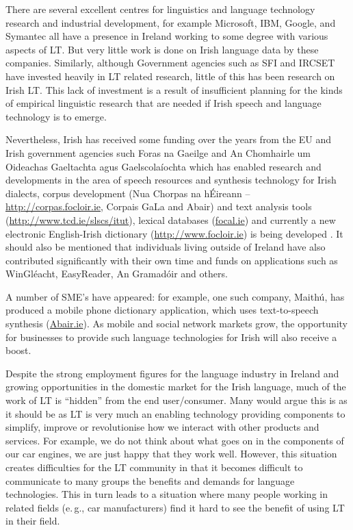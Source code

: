 \begin{multicols}{2}
There are several excellent centres for linguistics and language technology research and industrial development, for example Microsoft, IBM, Google, and Symantec all have a presence in Ireland working to some degree with various aspects of LT. But very little work is done on Irish language data by these companies. Similarly, although Government agencies such as SFI and IRCSET have invested heavily in LT related research, little of this has been research on Irish LT. This lack of investment is a result of insufficient planning for the kinds of empirical linguistic research that are needed if Irish speech and language technology is to emerge. 

Nevertheless, Irish has received some funding over the years from the EU and Irish government agencies such Foras na Gaeilge and An Chomhairle um Oideachas Gaeltachta agus Gaelscolaíochta which has enabled research and developments in the area of speech resources and synthesis technology for Irish dialects, corpus development (Nua Chorpas na hÉireann -- \url{http://corpas.focloir.ie}, Corpais GaLa and Abair) and text analysis tools (\url{http://www.tcd.ie/slscs/itut}), lexical databases (\url{focal.ie}) and currently  a new electronic English-Irish dictionary (\url{http://www.focloir.ie})  is being developed . It should also be mentioned that individuals living outside of Ireland have also contributed significantly with their own time and funds on applications such as WinGléacht, EasyReader, An Gramadóir and others.

A number of SME's have appeared: for example, one such company, Maithú, has produced a mobile phone dictionary application, which uses text-to-speech synthesis (\url{Abair.ie}). As mobile and social network markets grow, the opportunity for businesses to provide such language technologies for Irish will also receive a boost.

Despite the strong employment figures for the language industry in Ireland and growing opportunities in the domestic market for the Irish language, much of the work of LT is ``hidden'' from the end user/consumer. Many would argue this is as it should be as LT is very much an enabling technology providing components to simplify, improve or revolutionise how we interact with other products and services. For example, we do not think about what goes on in the components of our car engines, we are just happy that they work well. However, this situation creates difficulties for the LT community in that it becomes difficult to communicate to many groups the benefits and demands for language technologies. This in turn leads to a situation where many people working in related fields (e.\,g., car manufacturers) find it hard to see the benefit of using LT in their field.


\end{multicols}
